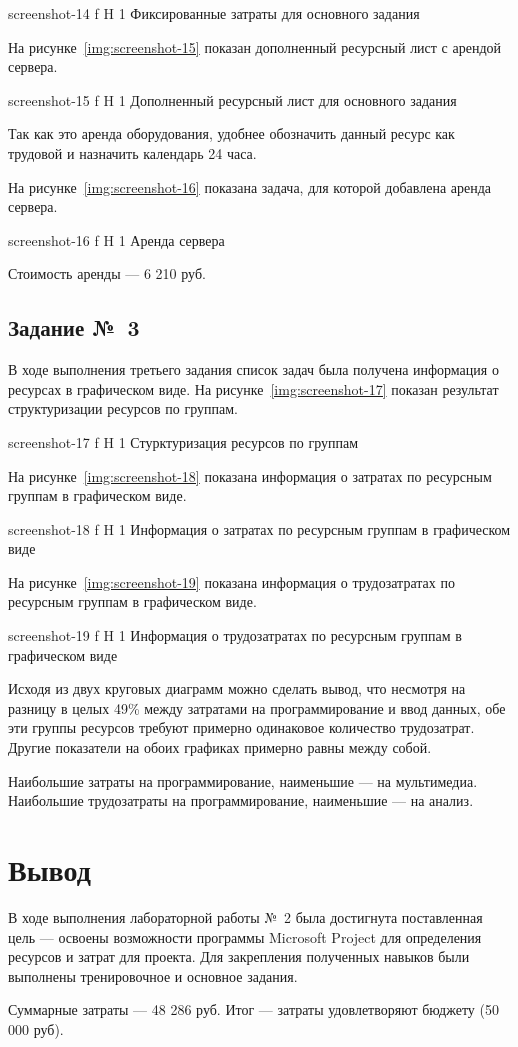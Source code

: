 \documentclass{bmstu}
\begin{document}
    {screenshot-14}
    {f}
    {H}
    {1\textwidth}
    {Фиксированные затраты для основного задания}
    
На рисунке~\ref{img:screenshot-15} показан дополненный ресурсный лист с арендой сервера.
    
    {screenshot-15}
    {f}
    {H}
    {1\textwidth}
    {Дополненный ресурсный лист для основного задания}
    
Так как это аренда оборудования, удобнее обозначить данный ресурс как трудовой и назначить календарь 24 часа.
    
На рисунке~\ref{img:screenshot-16} показана задача, для которой добавлена аренда сервера.
    
    {screenshot-16}
    {f}
    {H}
    {1\textwidth}
    {Аренда сервера}
    
Стоимость аренды --- 6 210 руб.

\subsection{Задание №~3}

В ходе выполнения третьего задания список задач была получена информация о ресурсах в графическом виде. 
На рисунке~\ref{img:screenshot-17} показан результат структуризации ресурсов по группам.
    
    {screenshot-17}
    {f}
    {H}
    {1\textwidth}
    {Стурктуризация ресурсов по группам}
    
На рисунке~\ref{img:screenshot-18} показана информация о затратах по ресурсным группам в графическом виде.

    {screenshot-18}
    {f}
    {H}
    {1\textwidth}
    {Информация о затратах по ресурсным группам в графическом виде}
    
На рисунке~\ref{img:screenshot-19} показана информация о трудозатратах по ресурсным группам в графическом виде.

    {screenshot-19}
    {f}
    {H}
    {1\textwidth}
    {Информация о трудозатратах по ресурсным группам в графическом виде}
    
Исходя из двух круговых диаграмм можно сделать вывод, что несмотря на разницу в целых 49\% между затратами на программирование и ввод данных, обе эти группы ресурсов требуют примерно одинаковое количество трудозатрат. 
Другие показатели на обоих графиках примерно равны между собой.

Наибольшие затраты на программирование, наименьшие --- на мультимедиа. 
Наибольшие трудозатраты на программирование, наименьшие --- на анализ.

\section{Вывод}

В ходе выполнения лабораторной работы №~2 была достигнута поставленная цель --- освоены возможности программы Microsoft Project для определения ресурсов и затрат для проекта. 
Для закрепления полученных навыков были выполнены тренировочное и основное задания.

Суммарные затраты --- 48 286 руб. 
Итог --- затраты удовлетворяют бюджету (50 000 руб).
\end{document}
